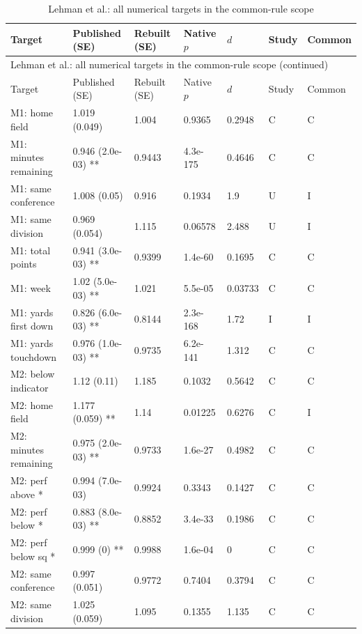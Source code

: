 {\scriptsize\setlength{\tabcolsep}{3pt}\renewcommand{\arraystretch}{1.06}
\begin{longtable}{@{}p{.245\linewidth}p{.17\linewidth}p{.17\linewidth}p{.085\linewidth}p{.060\linewidth}p{.08\linewidth}p{.07\linewidth}@{}}
\caption{Lehman et al.: all numerical targets in the common-rule scope}\label{tab:all:lehman2011}\\
\toprule Target & Published (SE) & Rebuilt (SE) & Native $p$ & $d$ & Study & Common\\\midrule
\endfirsthead\multicolumn{7}{l}{\small Lehman et al.: all numerical targets in the common-rule scope (continued)}\\\toprule Target & Published (SE) & Rebuilt (SE) & Native $p$ & $d$ & Study & Common\\\midrule\endhead\bottomrule\endfoot
M1: home field & 1.019 (0.049) & 1.004 & 0.9365 & 0.2948 & C & C\\
M1: minutes remaining & 0.946 (2.0e-03) ** & 0.9443 & 4.3e-175 & 0.4646 & C & C\\
M1: same conference & 1.008 (0.05) & 0.916 & 0.1934 & 1.9 & U & I\\
M1: same division & 0.969 (0.054) & 1.115 & 0.06578 & 2.488 & U & I\\
M1: total points & 0.941 (3.0e-03) ** & 0.9399 & 1.4e-60 & 0.1695 & C & C\\
M1: week & 1.02 (5.0e-03) ** & 1.021 & 5.5e-05 & 0.03733 & C & C\\
M1: yards first down & 0.826 (6.0e-03) ** & 0.8144 & 2.3e-168 & 1.72 & I & I\\
M1: yards touchdown & 0.976 (1.0e-03) ** & 0.9735 & 6.2e-141 & 1.312 & C & C\\
M2: below indicator & 1.12 (0.11) & 1.185 & 0.1032 & 0.5642 & C & C\\
M2: home field & 1.177 (0.059) ** & 1.14 & 0.01225 & 0.6276 & C & I\\
M2: minutes remaining & 0.975 (2.0e-03) ** & 0.9733 & 1.6e-27 & 0.4982 & C & C\\
M2: perf above * & 0.994 (7.0e-03) & 0.9924 & 0.3343 & 0.1427 & C & C\\
M2: perf below * & 0.883 (8.0e-03) ** & 0.8852 & 3.4e-33 & 0.1986 & C & C\\
M2: perf below sq * & 0.999 (0) ** & 0.9988 & 1.6e-04 & 0 & C & C\\
M2: same conference & 0.997 (0.051) & 0.9772 & 0.7404 & 0.3794 & C & C\\
M2: same division & 1.025 (0.059) & 1.095 & 0.1355 & 1.135 & C & C\\

\end{longtable}}
